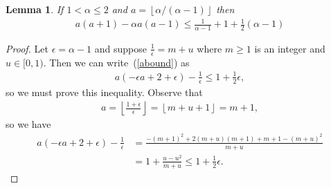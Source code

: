 \documentclass{amsart}
\newcommand{\floor}[1]{\left\lfloor#1\right \rfloor}
\numberwithin{equation}{section}
\newtheorem{lemma}[theorem]{Lemma}
\theoremstyle{definition}
\theoremstyle{remark}
\begin{document}
\begin{lemma}
If $1<\alpha\leq 2$ and $a = \floor{\alpha/(\alpha-1)}$ then
\begin{align}
\label{abound}
a(a+1) - \alpha a(a-1) \leq \frac{1}{\alpha - 1} + 1 + \frac{1}{2}(\alpha -1)
\end{align}
\end{lemma}
\begin{proof}
Let $\epsilon = \alpha - 1$ and suppose $\frac{1}{\epsilon} = m + u$ where $m \geq 1$ is an integer and $u \in [0,1)$.  Then we can write~(\ref{abound}) as
\begin{align*}
a(-\epsilon a +2 + \epsilon) - \frac{1}{\epsilon} \leq 1+ \frac12 \epsilon,
\end{align*}
so we must prove this inequality.  Observe that
\begin{align*}
a = \floor{\frac{1 + \epsilon}{\epsilon}} = \floor{m + u + 1} = m+1,
\end{align*}
so we have
\begin{align*}
a(-\epsilon a +2 + \epsilon) - \frac{1}{\epsilon} &= \frac{ - (m+1)^2 + 2(m+u)(m+1) + m+1 - (m+u)^2}{m+u}\\
&= 1 + \frac{u-u^2}{m+u} \leq 1 + \frac{1}{2}\epsilon.
\end{align*}
\end{proof}
\end{document}
